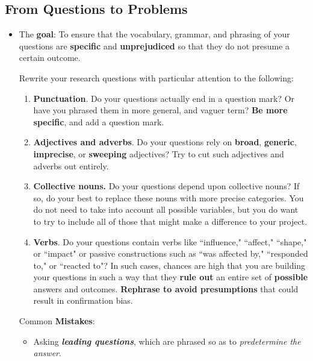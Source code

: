 \documentclass[11pt]{article}
\begin{document}
\subsection{From Questions to Problems}
\begin{itemize}
\item \begin{exercise}

The \textbf{goal}: To ensure that the vocabulary, grammar, and phrasing of your questions are \textbf{specific} and \textbf{unprejudiced} so that they do not presume a certain outcome.

Rewrite your research questions with particular attention to the following:
\begin{enumerate}
\item \textbf{Punctuation}. Do your questions actually end in a question mark? Or have you phrased them in more general, and vaguer term? \textbf{Be more specific}, and add a question mark.

\item \textbf{Adjectives and adverbs}. Do your questions rely on \textbf{broad}, \textbf{generic}, \textbf{imprecise}, or \textbf{sweeping} adjectives? Try to cut such adjectives and adverbs out entirely.

\item \textbf{Collective nouns.} Do your questions depend upon collective nouns? If so, do your best to replace these nouns with
more precise categories. You do not need to take into account all possible variables, but you do want to try to include all of those that might make a difference to your project.

\item \textbf{Verbs}. Do your questions contain verbs like ``influence," ``affect," ``shape," or ``impact" or passive constructions such as ``was affected by," ``responded to," or ``reacted to"? In such cases, chances are high that you are building your questions in such a way that they \textbf{rule out} an
entire set of \textbf{possible} answers and outcomes. \textbf{Rephrase to avoid presumptions} that could result in confirmation bias.
\end{enumerate}
\end{exercise}
Common \textbf{Mistakes}:
\begin{itemize}
\item Asking \emph{\textbf{leading questions}}, which are phrased so as to \emph{predetermine the answer}.


\end{itemize}
\end{itemize}
\end{document}
